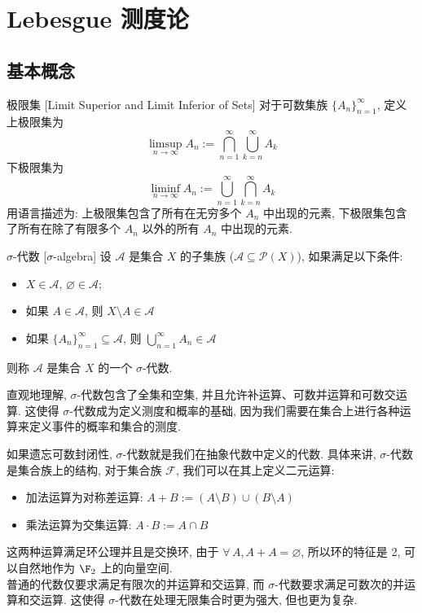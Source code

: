 \section{Lebesgue 测度论}
\subsection{基本概念}
\begin{dfn}
    {极限集}
    [Limit Superior and Limit Inferior of Sets]
    对于可数集族 \(\{A_n\}_{n=1}^\infty\), 定义
    上极限集为 
    \[\limsup_{n\to\infty} A_n := \bigcap_{n=1}^\infty \bigcup_{k=n}^\infty A_k\]
    下极限集为 
    \[\liminf_{n\to\infty} A_n := \bigcup_{n=1}^\infty \bigcap_{k=n}^\infty A_k\]
    用语言描述为: 上极限集包含了所有在无穷多个 \(A_n\) 中出现的元素, 下极限集包含了所有在除了有限多个 \(A_n\) 以外的所有 \(A_n\) 中出现的元素.
\end{dfn}
\begin{dfn}
    {\(\sigma\)-代数}
    [\(\sigma\)-algebra]
    设 \(\mathcal{A}\) 是集合 \(X\) 的子集族 (\(\mathcal{A}\subseteq\mathcal{P}(X)\)), 如果满足以下条件:
    \begin{itemize}
        \item \(X\in\mathcal{A}\), \(\varnothing\in\mathcal{A}\);
        \item 如果 \(A\in\mathcal{A}\), 则 \(X\setminus A\in\mathcal{A}\)
        \item 如果 \(\{A_n\}_{n=1}^\infty \subseteq \mathcal{A}\), 则 \(\bigcup_{n=1}^\infty A_n \in \mathcal{A}\)
    \end{itemize}
    则称 \(\mathcal{A}\) 是集合 \(X\) 的一个 \(\sigma\)-代数.
\end{dfn}
\begin{rmk}
    [AI]
    直观地理解, \(\sigma\)-代数包含了全集和空集, 并且允许补运算、可数并运算和可数交运算. 这使得 \(\sigma\)-代数成为定义测度和概率的基础, 因为我们需要在集合上进行各种运算来定义事件的概率和集合的测度.
\end{rmk}
\begin{rmk}
    [Dedicatia]
    如果遗忘可数封闭性, \(\sigma\)-代数就是我们在抽象代数中定义的代数. 具体来讲, \(\sigma\)-代数是集合族上的结构, 对于集合族 \(\mathcal{F}\), 我们可以在其上定义二元运算:
    \begin{itemize}
        \item 加法运算为对称差运算: \(A + B := (A\setminus B) \cup (B\setminus A)\)
        \item 乘法运算为交集运算: \(A \cdot B := A \cap B\)
    \end{itemize}
    这两种运算满足环公理并且是交换环, 由于 \(\forall\,A, A+A=\varnothing\), 所以环的特征是 2, 可以自然地作为 \(\F_2\) 上的向量空间.\\
    普通的代数仅要求满足有限次的并运算和交运算, 而 \(\sigma\)-代数要求满足可数次的并运算和交运算. 这使得 \(\sigma\)-代数在处理无限集合时更为强大, 但也更为复杂.
\end{rmk}
